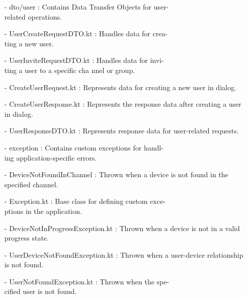 \documentclass[conference]{IEEEtran}
\begin{document}
\begin{enumerate}
        \item[-] dto/user : Contains Data Transfer Objects for user-\\related operations. \\
        \item[-] UserCreateRequestDTO.kt : Handles data for crea-\\ting a new user.\\
        \item[-] UserInviteRequestDTO.kt : Handles data for invi-\\ting a user to a specific cha
        nnel or group.\\
        \item[-] CreateUserRequest.kt : Represents data for creating a new user in dialog.\\
        \item[-] CreateUserResponse.kt : Represents the response data after creating a user in dialog.\\
        \item[-] UserResponseDTO.kt : Represents response data for user-related requests.\\
        
        \item[-] exception : Contains custom exceptions for handl-\\ing application-specific errors.\\
        \item[-] DeviceNotFoundInChannel : Thrown when a device is not found in the specified channel. \\
        \item[-] Exception.kt : Base class for defining custom exce-\\ptions in the application.\\
        \item[-] DeviceNotInProgressException.kt : Thrown when a device is not in a valid progress state.\\
        \item[-] UserDeviceNotFoundException.kt : Thrown when a user-device relationship is not found. \\
        \item[-] UserNotFoundException.kt : Thrown when the spe-\\cified user is not found.\\


\end{enumerate}
\end{document}
